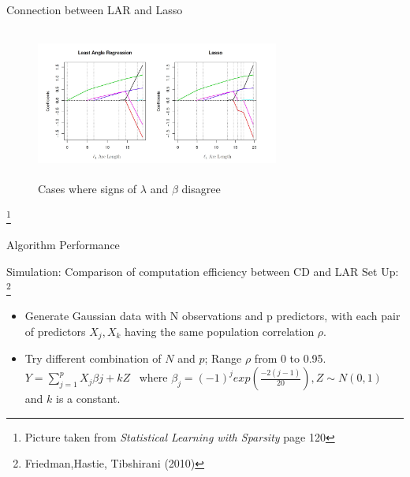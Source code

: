 \documentclass{beamer}
\begin{document}
\begin{frame}{Connection between LAR and Lasso}
\begin{figure}[h]
\centering
\includegraphics[width=8cm,height=5cm]{img/LARLasso}
\caption{Cases where signs of \(\lambda\) and \(\beta\) disagree}
\end{figure}
\footnote{Picture taken from \textit{Statistical Learning with Sparsity}  page 120 }
\end{frame}

\begin{frame}{Algorithm Performance}
\begin{block} {Simulation: Comparison of computation efficiency between CD and LAR}
\vspace*{3mm}
    Set Up: \footnote{Friedman,Hastie, Tibshirani (2010)}
    \begin{itemize}
        \item Generate Gaussian data with N observations and p predictors, with each pair of predictors \(X_j,X_k\) having the same population correlation \(\rho\).
        \item  Try different combination of $N$ and $p$; Range \(\rho\) from 0 to 0.95.\\
        \(Y=\sum_{j=1}^{p}X_j\beta{j}+kZ\) \ where \( \beta_j= (-1)^j exp(\frac{-2(j-1)}{20}), Z \sim N(0,1)\) and $k$ is a constant.
    \end{itemize}
\end{block}  

\end{frame}
\end{document}
